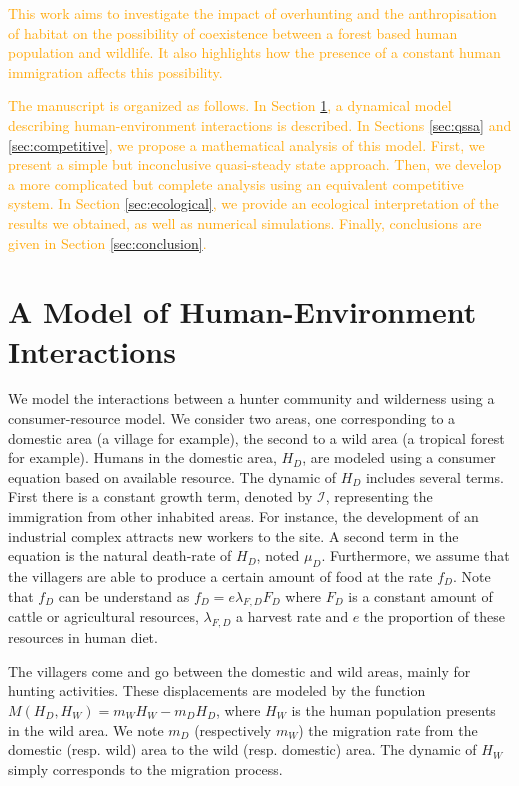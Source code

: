 \documentclass{article}
\newcommand{\lfd}{\lambda_{F, D}}
\newcommand{\cI}{\mathcal{I}}
\newcommand{\vdeux}[1]{\textcolor{orange}{#1}}
\theoremstyle{definition}
\theoremstyle{remark}
\begin{document}
\vdeux{
This work aims to investigate the impact of overhunting and the anthropisation of habitat on the possibility of coexistence between a forest based human population and wildlife. It also highlights how the presence of a constant human immigration affects this possibility.}

\vdeux{
The manuscript is organized as follows. In Section \ref{sec:model}, a dynamical model describing human-environment interactions is described. In Sections \ref{sec:qssa} and \ref{sec:competitive}, we propose a mathematical analysis of this model. First, we present a simple but inconclusive quasi-steady state approach. Then, we develop a more complicated but complete analysis using an equivalent competitive system. In Section \ref{sec:ecological}, we provide an ecological interpretation of the results we obtained, as well as numerical simulations. Finally, conclusions are given in Section \ref{sec:conclusion}.
}

\section{A Model of Human-Environment Interactions} \label{sec:model}
We model the interactions between a hunter community and wilderness using a consumer-resource model. We consider two areas, one corresponding to a domestic area (a village for example), the second to a wild area (a tropical forest for example). Humans in the domestic area, $H_D$, are modeled using a consumer equation based on available resource. The dynamic of $H_D$ includes several terms. First there is a constant growth term, denoted by $\cI$, representing the immigration from other inhabited areas. For instance, the development of an industrial complex attracts new workers to the site. A second term in the equation is the natural death-rate of $H_D$, noted $\mu_D$. Furthermore, we assume that the villagers are able to produce a certain amount of food at the rate $f_D$. Note that $f_D$ can be understand as $f_D = e \lfd F_D$ where $F_D$ is a constant amount of cattle or agricultural resources, $\lfd$ a harvest rate and $e$ the proportion of these resources in human diet. 

The villagers come and go between the domestic and wild areas, mainly for hunting activities. These displacements are modeled by the function $M(H_D, H_W) = m_W H_W - m_D H_D$, where $H_W$ is the human population presents in the wild area. We note $m_D$ (respectively $m_W$) the migration rate from the domestic (resp. wild) area to the wild (resp. domestic) area. The dynamic of $H_W$ simply corresponds to the migration process. 
\end{document}
